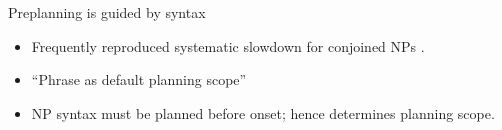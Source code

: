 
\begin{frame}{Preplanning is guided by syntax}

\begin{itemize}
		\item Frequently reproduced systematic slowdown for conjoined NPs \parencite[e.g.][]{martin2014working,smi99,wag10,wheeldon2013}.
		\item ``Phrase as default planning scope'' \parencite{martin2010planning}
		\item NP syntax must be planned before onset; hence determines planning scope.
\end{itemize}

\end{frame}


